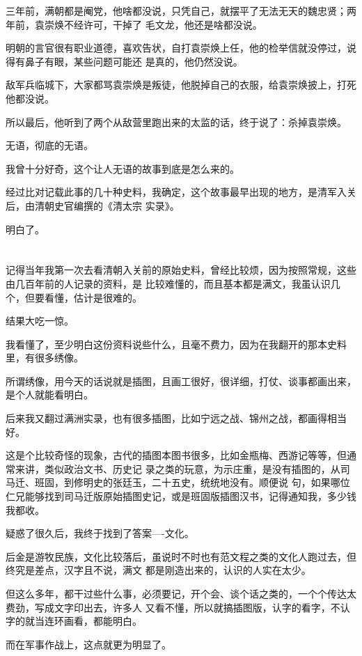 \documentclass[11pt,a4paper,onecolumn]{article}
\begin{document}
三年前，满朝都是阉党，他啥都没说，只凭自己，就摆平了无法无天的魏忠贤；两年前，袁崇焕不经许可，干掉了
毛文龙，他还是啥都没说。

明朝的言官很有职业道德，喜欢告状，自打袁崇焕上任，他的检举信就没停过，说得有鼻子有眼，某些问题可能还
是真的，他仍然没说。

敌军兵临城下，大家都骂袁崇焕是叛徒，他脱掉自己的衣服，给袁崇焕披上，打死他都没说。

所以最后，他听到了两个从敌营里跑出来的太监的话，终于说了：杀掉袁崇焕。

无语，彻底的无语。

我曾十分好奇，这个让人无语的故事到底是怎么来的。

经过比对记载此事的几十种史料，我确定，这个故事最早出现的地方，是清军入关后，由清朝史官编撰的《清太宗
实录》。

明白了。

\section[\thesection]{}

记得当年我第一次去看清朝入关前的原始史料，曾经比较烦，因为按照常规，这些由几百年前的人记录的资料，是
比较难懂的，而且基本都是满文，我虽认识几个，但要看懂，估计是很难的。

结果大吃一惊。

我看懂了，至少明白这份资料说些什么，且毫不费力，因为在我翻开的那本史料里，有很多绣像。

所谓绣像，用今天的话说就是插图，且画工很好，很详细，打仗、谈事都画出来，是个人就能看明白。

后来我又翻过满洲实录，也有很多插图，比如宁远之战、锦州之战，都画得相当好。

这是个比较奇怪的现象，古代的插图本图书很多，比如金瓶梅、西游记等等，但通常来讲，类似政治文书、历史记
录之类的玩意，为示庄重，是没有插图的，从司马迁、班固，到修明史的张廷玉，二十五史，统统地没有。顺便说
句，如果哪位仁兄能够找到司马迁版原始插图史记，或是班固版插图汉书，记得通知我，多少钱我都收。

疑惑了很久后，我终于找到了答案----文化。

后金是游牧民族，文化比较落后，虽说时不时也有范文程之类的文化人跑过去，但终究是差点，汉字且不说，满文
都是刚造出来的，认识的人实在太少。

但这么多年，都干过些什么事，必须要记，开个会、谈个话之类的，一个个传达太费劲，写成文字印出去，许多人
又看不懂，所以就搞插图版，认字的看字，不认字的就当连环画看，都能明白。

而在军事作战上，这点就更为明显了。
\end{document}
